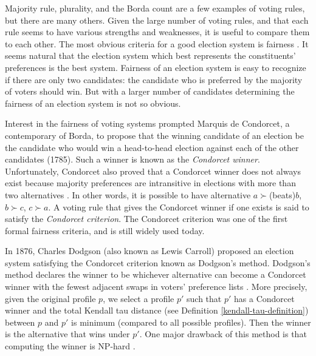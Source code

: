 	Majority rule, plurality, and the Borda count are a few examples of voting rules, but there are many others. Given the large number of voting rules, and that each rule seems to have various strengths and weaknesses, it is useful to compare them to each other. The most obvious criteria for a good election system is fairness \cite{chevaleyre2006issues}. It seems natural that the election system which best represents the constituents' preferences is the best system. Fairness of an election system is easy to recognize if there are only two candidates: the candidate who is preferred by the majority of voters should win. But with a larger number of candidates determining the fairness of an election system is not so obvious.

	Interest in the fairness of voting systems prompted Marquis de Condorcet, a contemporary of Borda, to propose that the winning candidate of an election be the candidate who would win a head-to-head election against each of the other candidates (1785). Such a winner is known as the \emph{Condorcet winner}. Unfortunately, Condorcet also proved that a Condorcet winner does not always exist because majority preferences are intransitive in elections with more than two alternatives \cite{le1785essai, black1998theory}. In other words, it is possible to have alternative $a \succ $(beats)$ b$, $b \succ c$, $c \succ a$. A voting rule that gives the Condorcet winner if one exists is said to satisfy the \emph{Condorcet criterion}. The Condorcet criterion was one of the first formal fairness criteria, and is still widely used today.

	In 1876, Charles Dodgson (also known as Lewis Carroll) proposed an election system satisfying the Condorcet criterion known as Dodgson's method. Dodgson's method declares the winner to be whichever alternative can become a Condorcet winner with the fewest adjacent swaps in voters' preference lists \cite{dodgson1876method}. More precisely, given the original profile $p$, we select a profile $p'$ such that $p'$ has a Condorcet winner and the total Kendall tau distance (see Definition \ref{kendall-tau-definition}) between $p$ and $p'$ is minimum (compared to all possible profiles). Then the winner is the alternative that wins under $p'$. One major drawback of this method is that computing the winner is NP-hard \cite{bartholdi1989voting}.

